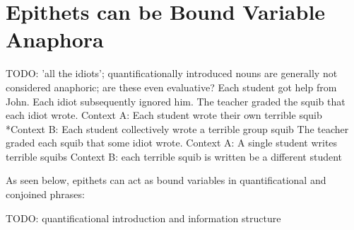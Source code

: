 \documentclass{article}
\begin{document}
\section{Epithets can be Bound Variable Anaphora}
TODO: 'all the idiots'; quantificationally introduced nouns are generally not considered anaphoric; are these even evaluative?
Each student got help from John. Each idiot subsequently ignored him.
The teacher graded the squib that each idiot wrote.
Context A: Each student wrote their own terrible squib
*Context B: Each student collectively wrote a terrible group squib
The teacher graded each squib that some idiot wrote.
Context A: A single student writes terrible squibs
Context B: each terrible squib is written be a different student

As seen below, epithets can act as bound variables in quantificational and conjoined phrases:
\begin{exe}
	TODO: quantificational introduction and information structure
\end{exe}
\end{document}
